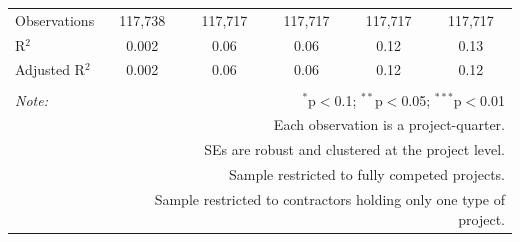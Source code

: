 \documentclass[
]{article}
\begin{document}
\begin{table}[H]
\begin{tabular}{@{\extracolsep{-2pt}}lccccc}
Observations & 117,738 & 117,717 & 117,717 & 117,717 & 117,717 \\ 
R$^{2}$ & 0.002 & 0.06 & 0.06 & 0.12 & 0.13 \\ 
Adjusted R$^{2}$ & 0.002 & 0.06 & 0.06 & 0.12 & 0.12 \\ 
\hline 
\hline \\[-1.8ex] 
\textit{Note:}  & \multicolumn{5}{r}{$^{*}$p$<$0.1; $^{**}$p$<$0.05; $^{***}$p$<$0.01} \\ 
 & \multicolumn{5}{r}{Each observation is a project-quarter.} \\ 
 & \multicolumn{5}{r}{SEs are robust and clustered at the project level.} \\ 
 & \multicolumn{5}{r}{Sample restricted to fully competed projects.} \\ 
 & \multicolumn{5}{r}{Sample restricted to contractors holding only one type of project.} \\ 
\end{tabular} 
\end{table}
\end{document}
